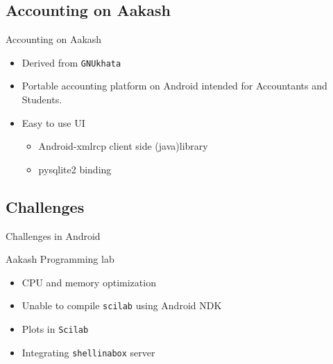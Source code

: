 \documentclass{beamer}
\begin{document}
  \subsection{Accounting on Aakash}
  \begin{frame}{Accounting on Aakash}
    \begin{itemize}
      \item Derived from {\tt GNUkhata}
      \item Portable accounting platform on Android intended for
        Accountants and Students.
      \item Easy to use UI
        \pause
        \begin{itemize}
          \item Android-xmlrcp client side (java)library
          \item pysqlite2 binding
        \end{itemize}
        \pause
    \end{itemize}
    \begin{block}{}
    \end{block}
  \end{frame}

  \subsection{Challenges}
  \begin{frame}{Challenges in Android}
    \begin{block}{Aakash Programming lab}
      \begin{itemize}
        \item CPU and memory optimization
        \item Unable to compile {\tt scilab} using Android NDK
        \item Plots in {\tt Scilab}
        \item Integrating {\tt shellinabox} server
      \end{itemize}
    \end{block}
    \end{frame}
\end{document}
